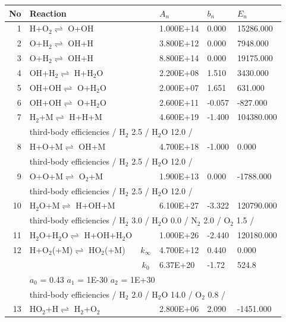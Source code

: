 \documentclass[11pt]{article}
\begin{document}
\begin{table}[hbt]
\begin{tabular}{|r l c l l l|} \hline 
No& Reaction &   & $A_n$& $b_n$ & $E_n$\\ \hline 
1 &	H+O$_{2}$$\rightleftharpoons$ O+OH&	&	1.000E+14&	0.000&	15286.000\\ 
2 &	O+H$_{2}$$\rightleftharpoons$ OH+H&	&	3.800E+12&	0.000&	7948.000\\ 
3 &	O+H$_{2}$$\rightleftharpoons$ OH+H&	&	8.800E+14&	0.000&	19175.000\\ 
4 &	OH+H$_{2}$$\rightleftharpoons$ H+H$_{2}$O&	&	2.200E+08&	1.510&	3430.000\\ 
5 &	OH+OH$\rightleftharpoons$ O+H$_{2}$O&	&	2.000E+07&	1.651&	631.000\\ 
6 &	OH+OH$\rightleftharpoons$ O+H$_{2}$O&	&	2.600E+11&	-0.057&	-827.000\\ 
7 &	H$_{2}$+M$\rightleftharpoons$ H+H+M&	&	4.600E+19&	-1.400&	104380.000\\ 
	&\multicolumn{5}{l|}{third-body efficiencies  / H$_{2}$ 2.5 / H$_{2}$O 12.0 /}\\ 
8 &	H+O+M$\rightleftharpoons$ OH+M&	&	4.700E+18&	-1.000&	0.000\\ 
	&\multicolumn{5}{l|}{third-body efficiencies  / H$_{2}$ 2.5 / H$_{2}$O 12.0 /}\\ 
9 &	O+O+M$\rightleftharpoons$ O$_{2}$+M&	&	1.900E+13&	0.000&	-1788.000\\ 
	&\multicolumn{5}{l|}{third-body efficiencies  / H$_{2}$ 2.5 / H$_{2}$O 12.0 /}\\ 
10 &	H$_{2}$O+M$\rightleftharpoons$ H+OH+M&	&	6.100E+27&	-3.322&	120790.000\\ 
	&\multicolumn{5}{l|}{third-body efficiencies  / H$_{2}$ 3.0 / H$_{2}$O 0.0 / N$_{2}$ 2.0 / O$_{2}$ 1.5 /}\\ 
11 &	H$_{2}$O+H$_{2}$O$\rightleftharpoons$ H+OH+H$_{2}$O&	&	1.000E+26&	-2.440&	120180.000\\ 
12 &	H+O$_{2}$(+M)$\rightleftharpoons$ HO$_{2}$(+M)&	$k_{\infty}$&	4.700E+12&	0.440&	0.000\\ 
	&	&	$k_0$&	6.37E+20&-1.72&	  524.8\\ 
	&\multicolumn{5}{l|}{	$a_0$ = 0.43	$a_1$ = 1E-30	$a_2$ = 1E+30}\\ 
	&\multicolumn{5}{l|}{third-body efficiencies  / H$_{2}$ 2.0 / H$_{2}$O 14.0 / O$_{2}$ 0.8 /}\\ 
13 &	HO$_{2}$+H$\rightleftharpoons$ H$_{2}$+O$_{2}$&	&	2.800E+06&	2.090&	-1451.000\\ 

\end{tabular}
\end{table}
\end{document}
